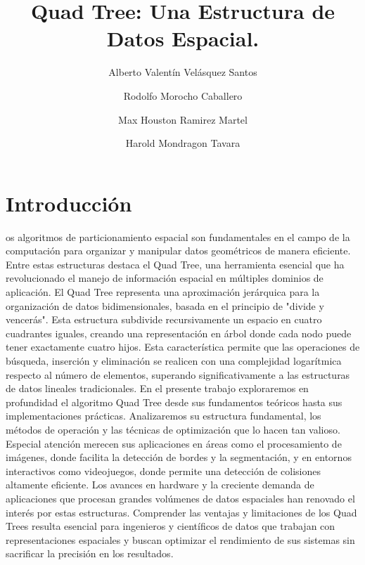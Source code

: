 \documentclass[9pt,a4paper,twoside]{rho-class/rho}
\title{ Quad Tree: Una Estructura de Datos Espacial. }
\author[,$\dagger$]{Alberto Valentín Velásquez Santos}
\author[,$\dagger$]{Rodolfo Morocho Caballero}
\author[,$\dagger$]{Max Houston Ramirez Martel}
\author[,$\dagger$]{Harold Mondragon Tavara}
\affil[$\dagger$]{Estos autores contribuyeron igualmente a este trabajo.}
\begin{document}
	
    \maketitle
    \section{Introducción}

        os algoritmos de particionamiento espacial son fundamentales en el campo de la computación para organizar y manipular datos geométricos de manera eficiente. Entre estas estructuras destaca el Quad Tree, una herramienta esencial que ha revolucionado el manejo de información espacial en múltiples dominios de aplicación.
        El Quad Tree representa una aproximación jerárquica para la organización de datos bidimensionales, basada en el principio de "divide y vencerás". Esta estructura subdivide recursivamente un espacio en cuatro cuadrantes iguales, creando una representación en árbol donde cada nodo puede tener exactamente cuatro hijos. Esta característica permite que las operaciones de búsqueda, inserción y eliminación se realicen con una complejidad logarítmica respecto al número de elementos, superando significativamente a las estructuras de datos lineales tradicionales.
        En el presente trabajo exploraremos en profundidad el algoritmo Quad Tree desde sus fundamentos teóricos hasta sus implementaciones prácticas. Analizaremos su estructura fundamental, los métodos de operación y las técnicas de optimización que lo hacen tan valioso. Especial atención merecen sus aplicaciones en áreas como el procesamiento de imágenes, donde facilita la detección de bordes y la segmentación, y en entornos interactivos como videojuegos, donde permite una detección de colisiones altamente eficiente.
        Los avances en hardware y la creciente demanda de aplicaciones que procesan grandes volúmenes de datos espaciales han renovado el interés por estas estructuras. Comprender las ventajas y limitaciones de los Quad Trees resulta esencial para ingenieros y científicos de datos que trabajan con representaciones espaciales y buscan optimizar el rendimiento de sus sistemas sin sacrificar la precisión en los resultados.
\end{document}
